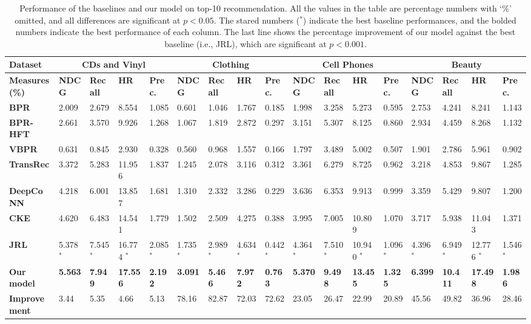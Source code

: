 \documentclass[algorithms,article,accept,moreauthors,pdftex,10pt,a4paper]{Definitions/mdpi}
\begin{document}
\begin{table}[H]
\caption{Performance of the baselines and our model on top-10 recommendation. 
		All the values in the table are percentage numbers with `\%' omitted, and all differences are significant at $p <0.05$.
		The stared numbers ($^*$) indicate the best baseline performances, and the bolded numbers indicate the best performance of each column. 
		The last line shows the percentage improvement of our model against the best baseline (i.e., JRL), which are significant at $p<0.001$.}
	\hspace{-0.9cm}
	\setlength{\tabcolsep}{0pt}
	\begin{tabular}
{lllllllllllllllll} 
	\toprule
		\bf{Dataset} &  \multicolumn{4}{c}{\bf{CDs and Vinyl}} & \multicolumn{4}{c}{\bf{Clothing}} & \multicolumn{4}{c}{\bf{Cell Phones}} & \multicolumn{4}{c}{\bf{Beauty}}\\\hline
		\bf{Measures}(\%) & \bf{NDCG} &  \bf{Recall} &  \bf{HR} & \bf{Prec.} &\bf{ NDCG} & \bf{Recall} & \bf{HR} & \bf{Prec.} & \bf{NDCG} &\bf{ Recall} & \bf{HR} & \bf{Prec.} & \bf{NDCG} & \bf{Recall} & \bf{HR} & \bf{Prec.} \\\hline
		\bf{BPR}  & 2.009 & 2.679 & 8.554 & 1.085 & 0.601 & 1.046 & 1.767 & 0.185 & 1.998 & 3.258 & 5.273 & 0.595 & 2.753 & 4.241 & 8.241 & 1.143\\
		\bf{BPR-HFT} & 2.661 & 3.570 & 9.926 & 1.268 & 1.067 & 1.819 & 2.872 & 0.297 & 3.151 & 5.307 & 8.125 & 0.860 & 2.934  & 4.459 & 8.268 & 1.132\\
		\bf{VBPR} & 0.631 & 0.845 & 2.930 & 0.328 & 0.560 & 0.968 & 1.557 & 0.166 & 1.797 & 3.489 & 5.002 & 0.507 & 1.901 & 2.786 & 5.961 & 0.902\\
		\bf{TransRec} & 3.372 & 5.283 & 11.956 & 1.837 & 1.245 & 2.078 & 3.116 & 0.312 & 3.361 & 6.279 & 8.725 & 0.962 & 3.218  & 4.853 & 9.867 & 1.285\\
		\bf{DeepCoNN}  & 4.218 & 6.001 & 13.857 & 1.681 & 1.310 & 2.332 & 3.286 & 0.229 & 3.636 & 6.353 & 9.913 & 0.999 & 3.359 & 5.429 & 9.807 & 1.200\\
		\bf{CKE}  & 4.620 & 6.483 & 14.541 & 1.779 & 1.502 & 2.509 & 4.275 & 0.388 & 3.995 & 7.005 & 10.809 & 1.070 & 3.717 & 5.938 & 11.043 & 1.371\\
		\bf{JRL}& {5.378} $^*$ & {7.545} $^*$ & {16.774} $^*$ & {2.085} $^*$ & {1.735} $^*$ & {2.989} $^*$ & {4.634} $^*$ & {0.442} $^*$ & {4.364} $^*$ & {7.510} $^*$ & {10.940} $^*$ & {1.096} $^*$ & {4.396} $^*$ & {6.949} $^*$ & {12.776} $^*$ & {1.546} $^*$\\\hline
		\bf{Our model} & \textbf{5.563} & \textbf{7.949} & \textbf{17.556} & \textbf{2.192} & \textbf{3.091} & \textbf{5.466} & \textbf{7.972} & \textbf{0.763} & \textbf{5.370} & \textbf{9.498} & \textbf{13.455} & \textbf{1.325} & \textbf{6.399} & \textbf{10.411} & \textbf{17.498} & \textbf{1.986}\\\hline
		\bf{Improvement} & 3.44 & 5.35  & 4.66 & 5.13 & 78.16 & 82.87 & 72.03 & 72.62 & 23.05 & 26.47 & 22.99 & 20.89 & 45.56 & 49.82 & 36.96 & 28.46\\
	\bottomrule
	\end{tabular}\label{tab:result}
\end{table}
\end{document}
